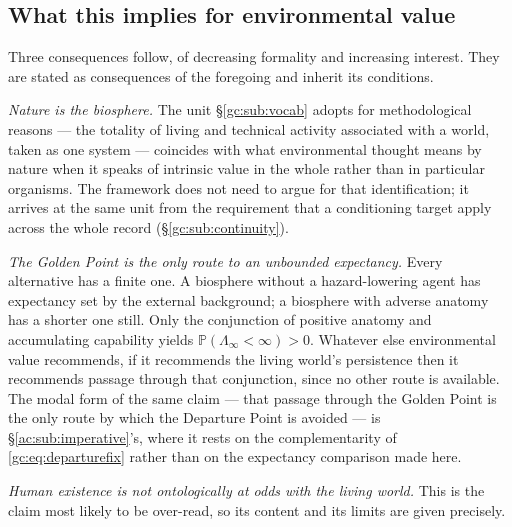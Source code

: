 \documentclass[11pt]{article}
\numberwithin{equation}{section}
\theoremstyle{plain}
\theoremstyle{definition}
\theoremstyle{remark}
\newcommand{\PP}{\mathbb{P}}
\begin{document}
\subsection{What this implies for environmental value}
\label{hr:sub:environment}

Three consequences follow, of decreasing formality and increasing
interest. They are stated as consequences of the foregoing and inherit
its conditions.

\emph{Nature is the biosphere.} The unit \S\ref{gc:sub:vocab} adopts for
methodological reasons --- the totality of living and technical activity
associated with a world, taken as one system --- coincides with what
environmental thought means by nature when it speaks of intrinsic value
in the whole rather than in particular organisms. The framework does not
need to argue for that identification; it arrives at the same unit from
the requirement that a conditioning target apply across the whole record
(\S\ref{gc:sub:continuity}).

\emph{The Golden Point is the only route to an unbounded expectancy.}
Every alternative has a finite one. A biosphere without a
hazard-lowering agent has expectancy set by the external background; a
biosphere with adverse anatomy has a shorter one still. Only the
conjunction of positive anatomy and accumulating capability yields
$\PP(\Lambda_\infty<\infty)>0$. Whatever else environmental value
recommends, if it recommends the living world's persistence then it
recommends passage through that conjunction, since no other route is
available. The modal form of the same claim --- that passage through the
Golden Point is the only route by which the Departure Point is avoided ---
is \S\ref{ac:sub:imperative}'s, where it rests on the complementarity of
\eqref{gc:eq:departurefix} rather than on the expectancy comparison made
here.

\emph{Human existence is not ontologically at odds with the living
world.} This is the claim most likely to be over-read, so its content
and its limits are given precisely.
\end{document}
